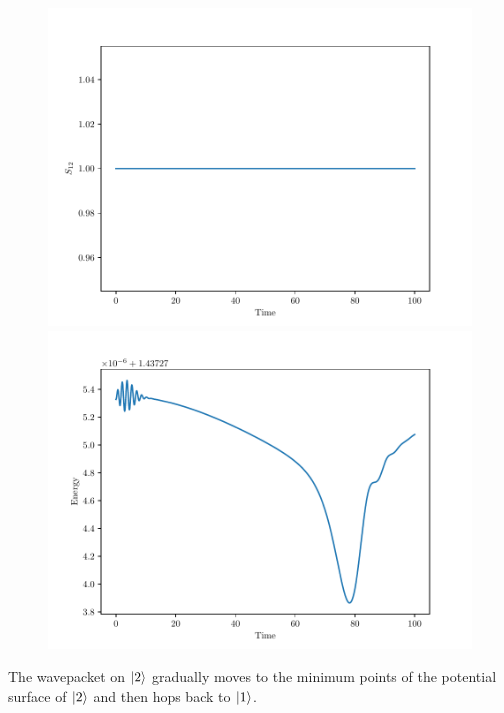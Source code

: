 \documentclass{article}
\begin{document}
\begin{enumerate}[1.]
\begin{enumerate}[(i)]
    \begin{figure}[H]
      \centering
      \begin{minipage}{0.48\linewidth}
        \centering
        \includegraphics[width=\linewidth]{q3-2_time_s12.pdf}
      \end{minipage}
      \begin{minipage}{0.48\linewidth}
        \centering
        \includegraphics[width=\linewidth]{q3-2_time_energy.pdf}
      \end{minipage}
      \caption{}
      \label{fig:3-2}
    \end{figure}

    The wavepacket on $\ket{2}$ gradually moves to the minimum points of the potential surface of $\ket{2}$ and then hops back to $\ket{1}$.


\end{enumerate}
\end{enumerate}
\end{document}
